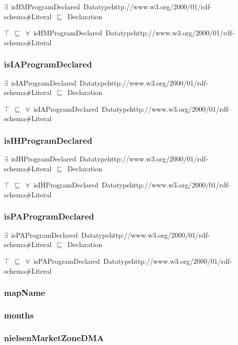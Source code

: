 \documentclass{article}
\begin{document}
\ensuremath{\exists}~isHMProgramDeclared~Datatypehttp://www.w3.org/2000/01/rdf-schema#Literal~\ensuremath{\sqsubseteq}~Declaration

\ensuremath{\top}~\ensuremath{\sqsubseteq}~\ensuremath{\forall}~isHMProgramDeclared~Datatypehttp://www.w3.org/2000/01/rdf-schema#Literal

\subsubsection*{isIAProgramDeclared}

\ensuremath{\exists}~isIAProgramDeclared~Datatypehttp://www.w3.org/2000/01/rdf-schema#Literal~\ensuremath{\sqsubseteq}~Declaration

\ensuremath{\top}~\ensuremath{\sqsubseteq}~\ensuremath{\forall}~isIAProgramDeclared~Datatypehttp://www.w3.org/2000/01/rdf-schema#Literal

\subsubsection*{isIHProgramDeclared}

\ensuremath{\exists}~isIHProgramDeclared~Datatypehttp://www.w3.org/2000/01/rdf-schema#Literal~\ensuremath{\sqsubseteq}~Declaration

\ensuremath{\top}~\ensuremath{\sqsubseteq}~\ensuremath{\forall}~isIHProgramDeclared~Datatypehttp://www.w3.org/2000/01/rdf-schema#Literal

\subsubsection*{isPAProgramDeclared}

\ensuremath{\exists}~isPAProgramDeclared~Datatypehttp://www.w3.org/2000/01/rdf-schema#Literal~\ensuremath{\sqsubseteq}~Declaration

\ensuremath{\top}~\ensuremath{\sqsubseteq}~\ensuremath{\forall}~isPAProgramDeclared~Datatypehttp://www.w3.org/2000/01/rdf-schema#Literal

\subsubsection*{mapName}

\subsubsection*{months}

\subsubsection*{nielsenMarketZoneDMA}
\end{document}
